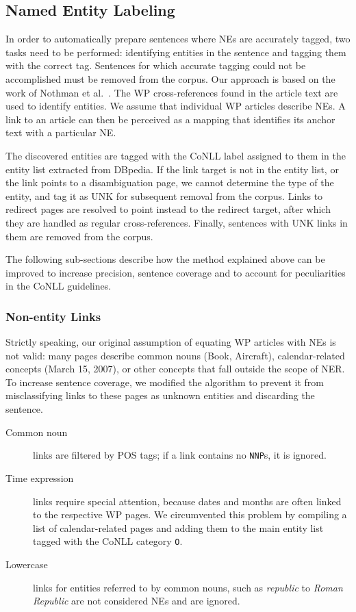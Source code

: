 \documentclass[11pt]{article}
\begin{document}

\subsection{Named Entity Labeling}

In order to automatically prepare sentences where NEs are accurately tagged,
two tasks need to be performed: identifying entities in the sentence and
tagging them with the correct tag. Sentences for which accurate tagging could
not be accomplished must be removed from the corpus. Our approach is based on
the work of Nothman et al.~. The WP cross-references
found in the article text are used to identify entities. We assume that
individual WP articles describe NEs. A link to an article can then be
perceived as a mapping that identifies its anchor text with a particular NE.

The discovered entities are tagged with the CoNLL label assigned to them in
the entity list extracted from DBpedia. If the link target is not in the
entity list, or the link points to a disambiguation page, we cannot determine
the type of the entity, and tag it as UNK for subsequent removal from the
corpus. Links to redirect pages are resolved to point instead to the redirect
target, after which they are handled as regular cross-references. Finally, sentences with UNK links in them are removed from the corpus.

The following sub-sections describe how the method explained above can be
improved to increase precision, sentence coverage and to account for
peculiarities in the CoNLL guidelines.

\subsubsection{Non-entity Links}

Strictly speaking, our original assumption of equating WP articles with NEs is not valid: many pages describe common nouns (Book, Aircraft), calendar-related concepts (March 15, 2007), or other concepts that fall outside the scope of NER. To increase sentence coverage, we modified the algorithm to prevent it from misclassifying links to these pages as unknown entities and discarding the sentence.

\begin{description}
\item[Common noun] links are filtered by POS tags; if a link contains no \texttt{NNP}s, it is ignored.
\item[Time expression] links require special attention, because dates and
  months are often linked to the respective WP pages. We circumvented this
  problem by compiling a list of calendar-related pages and adding them to the
  main entity list tagged with the CoNLL category \texttt{O}.
\item[Lowercase] links for entities referred to by common nouns, such as \textit{republic} to \textit{Roman Republic} are not considered NEs and are ignored.
\end{description}
\end{document}
